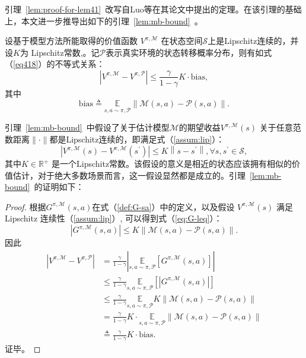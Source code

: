 引理~\ref{lem:proof-for-lem41}~改写自Luo等\cite{luo2018algorithmic}在其论文中提出的定理。在该引理的基础上，本文进一步推导出如下的引理~\ref{lem:mb-bound}~。

\begin{lemma}\label{lem:mb-bound}
设基于模型方法所能取得的价值函数 ${V}^{\pi,\mathcal{M}}$ 在状态空间$\mathcal{S}$上是Lipschitz连续的，并设$K$为 Lipschitz常数,。记$\mathcal{P}$表示真实环境的状态转移概率分布，则有如式（\ref{eq418}）的不等式关系：
\begin{equation}\label{eq418}
\left|{V}^{\pi, \mathcal{M}}-{V}^{\pi, \mathcal{P}}\right| \leq\frac{\gamma}{1-\gamma}K\cdot\mathrm{bias},
\end{equation}
其中
\begin{equation}
\mathrm{bias} \triangleq \underset{s,a\sim \pi,\mathcal{P}}{\mathbb{E}}\left\|\mathcal{M}(s, a)-\mathcal{P}(s, a)\right\|.
\end{equation}

\label{theo:mb-bound}
\end{lemma}

引理~\ref{lem:mb-bound}~中假设了关于估计模型$\mathcal{M}$的期望收益${V}^{\pi,\mathcal{M}}(s)$ 关于任意范数距离$\|\cdot\|$都是Lipschitz连续的，即满足式（\ref{assum:lip}）：
\begin{equation}\label{assum:lip}
    \left|{V}^{\pi,\mathcal{M}}(s)-{V}^{\pi,\mathcal{M}}(s^{\prime})\right| \leq K\left\|s-s^{\prime}\right\|, \forall s, s^{\prime} \in \mathcal{S},
\end{equation}
其中$K\in \mathbb{R}^+$ 是一个Lipschitz常数。该假设的意义是相近的状态应该拥有相似的价值估计，对于绝大多数场景而言，这一假设显然都是成立的。引理~\ref{lem:mb-bound}~的证明如下：

\begin{proof}

根据$G^{\pi,\mathcal{M}}(s,a)$在式（\ref{def:G-sa}）中的定义，以及假设 ${V}^{\pi,\mathcal{M}}(s)$ 满足 Lipschitz 连续性（\ref{assum:lip}）, 可以得到式（\ref{eq:G-leq}）：
\begin{equation}\label{eq:G-leq}
|G^{\pi,\mathcal{M}}(s,a)|\leq K\|\mathcal{M}(s,a)-\mathcal{P}(s,a)\|.
\end{equation}
因此
\begin{equation}
\begin{aligned}
\left|{V}^{\pi, \mathcal{M}}-{V}^{\pi, \mathcal{P}}\right| &= \frac{\gamma}{1-\gamma}\left|\underset{s,a\sim\pi,\mathcal{P}}{\mathbb{E}}\left[G^{\pi,\mathcal{M}}(s,a)\right]\right|\\
&\leq \frac{\gamma}{1-\gamma}\underset{s,a\sim\pi,\mathcal{P}}{\mathbb{E}}\left[\left|G^{\pi,\mathcal{M}}(s,a)\right|\right]\\
&\leq \frac{\gamma}{1-\gamma}\underset{s,a\sim\pi,\mathcal{P}}{\mathbb{E}}K\|\mathcal{M}(s,a)-\mathcal{P}(s,a)\|\\
&= \frac{\gamma}{1-\gamma}K\cdot\underset{s,a\sim\pi,\mathcal{P}}{\mathbb{E}}\|\mathcal{M}(s,a)-\mathcal{P}(s,a)\|\\
&\triangleq \frac{\gamma}{1-\gamma}K\cdot\mathrm{bias}.
\end{aligned}
\end{equation}
证毕。
\end{proof}

